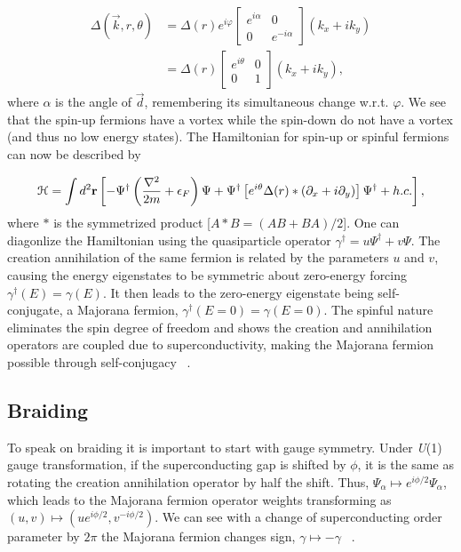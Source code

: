 \begin{align}
  \Delta (\vec{k},r,\theta) &= \Delta(r) e^{i\varphi}
  \begin{bmatrix}
    e^{i\alpha} & 0 \\
    0 & e^{-i\alpha}
  \end{bmatrix}
  (k_x + i k_y) \nonumber \\
  &= \Delta(r)
  \begin{bmatrix}
    e^{i\theta} & 0 \\
    0 & 1
  \end{bmatrix}
  (k_x + i k_y),
\end{align}
where $\alpha$ is the angle of $\vec{d}$, remembering its simultaneous change w.r.t. $\varphi$.
We see that the spin-up fermions have a vortex while the spin-down do not have a vortex (and thus no low energy states).
The Hamiltonian for spin-up or spinful fermions can now be described by

\begin{equation}
  \mathcal{H} = \int d^2 \mathbf{r} \left[ -\Psi^{\dagger} \left( \dfrac{\nabla^2}{2m} + \epsilon_F \right) \Psi + \Psi^{\dagger} \left[ e^{i\theta} \Delta(r) * \left( \partial_x +i\partial_y \right) \right] \Psi^{\dagger} + h.c. \right],
\end{equation}
where $*$ is the symmetrized product
[$A*B = (AB + BA) / 2$].
One can diagonlize the Hamiltonian using the quasiparticle operator
$\gamma^{\dagger} = u\Psi^{\dagger} + v\Psi$.
The creation annihilation of the same fermion is related by the parameters $u$ and $v$, causing the energy eigenstates to be symmetric about zero-energy forcing
$\gamma^{\dagger}(E) = \gamma (E)$.
It then leads to the zero-energy eigenstate being self-conjugate, a Majorana fermion,
$\gamma^{\dagger}(E=0) = \gamma (E=0)$.
The spinful nature eliminates the spin degree of freedom and shows the creation and annihilation operators are coupled due to superconductivity, making the Majorana fermion possible through self-conjugacy ~\cite{ivanovNonAbelianStatisticsHalfQuantum2001}.

\subsection{Braiding}
To speak on braiding it is important to start with gauge symmetry.
Under \textit{U}(1) gauge transformation, if the superconducting gap is shifted by $\phi$, it is the same as rotating the creation annihilation operator by half the shift.
Thus, $\Psi_{\alpha} \mapsto e^{i\phi/2} \Psi_{\alpha}$, which leads to the Majorana fermion operator weights transforming as $(u,v) \mapsto (ue^{i\phi/2}, v^{-i\phi/2})$.
We can see with a change of superconducting order parameter by $2\pi$ the Majorana fermion changes sign, $\gamma \mapsto -\gamma$ ~\cite{ivanovNonAbelianStatisticsHalfQuantum2001}.

